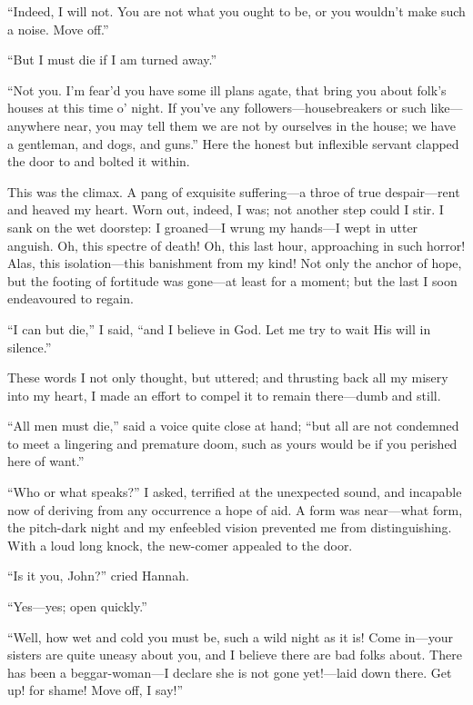 \enquote{Indeed, I will not. You are not what you ought to be, or you
	wouldn't make such a noise. Move off.}

\enquote{But I must die if I am turned away.}

\enquote{Not you. I'm fear'd you have some ill plans agate, that bring
	you about folk's houses at this time o' night. If you've any
	followers---housebreakers or such like---anywhere near, you may tell
	them we are not by ourselves in the house; we have a gentleman, and
	dogs, and guns.} Here the honest but inflexible servant clapped the
door to and bolted it within.

This was the climax. A pang of exquisite suffering---a throe of true
despair---rent and heaved my heart. Worn out, indeed, I was; not
another step could I stir. I sank on the wet doorstep: I groaned---I
wrung my hands---I wept in utter anguish. Oh, this spectre of death!
Oh, this last hour, approaching in such horror! Alas, this
isolation---this banishment from my kind! Not only the anchor of hope,
but the footing of fortitude was gone---at least for a moment; but the
last I soon endeavoured to regain.

\enquote{I can but die,} I said, \enquote{and I believe in God. Let me
	try to wait His will in silence.}

These words I not only thought, but uttered; and thrusting back all my
misery into my heart, I made an effort to compel it to remain
there---dumb and still.

\enquote{All men must die,} said a voice quite close at hand;
\enquote{but all are not condemned to meet a lingering and premature
	doom, such as yours would be if you perished here of want.}

\enquote{Who or what speaks?} I asked, terrified at the unexpected
sound, and incapable now of deriving from any occurrence a hope of aid.
A form was near---what form, the pitch-dark night and my enfeebled
vision prevented me from distinguishing. With a loud long knock, the
new-comer appealed to the door.

\enquote{Is it you, \Mr{} \St{} John?} cried Hannah.

\enquote{Yes---yes; open quickly.}

\enquote{Well, how wet and cold you must be, such a wild night as it
	is! Come in---your sisters are quite uneasy about you, and I believe
	there are bad folks about. There has been a beggar-woman---I declare
	she is not gone yet!---laid down there. Get up! for shame! Move off, I
	say!}

